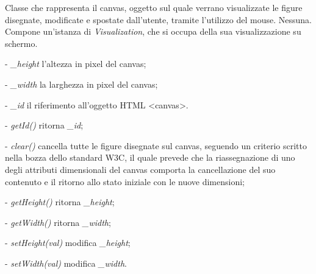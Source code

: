 Classe che rappresenta il canvas, oggetto sul quale verrano visualizzate le figure disegnate, modificate e spostate dall'utente, tramite l'utilizzo del mouse. 
Nessuna.
Compone un'istanza di \textit{Visualization}, che si occupa della sua visualizzazione su schermo.
\begin{elencopuntato}[\subsubsecindent]
\item[-] \textit{{\_}height} l'altezza in pixel del canvas;
\item[-] \textit{{\_}width} la larghezza in pixel del canvas;
\item[-] \textit{{\_}id} il riferimento all'oggetto HTML <canvas>.
\end{elencopuntato}
\begin{elencopuntato}[\subsubsecindent]
\item[-] \textit{getId()} ritorna  \textit{{\_}id};
\item[-] \textit{clear()} cancella tutte le figure disegnate sul canvas, seguendo un criterio scritto nella bozza dello standard W3C, il quale prevede che la riassegnazione di uno degli attributi dimensionali del canvas comporta la cancellazione del suo contenuto e il ritorno allo stato iniziale con le nuove dimensioni;
\item[-] \textit{getHeight()} ritorna  \textit{{\_}height};
\item[-] \textit{getWidth()} ritorna  \textit{{\_}width};
\item[-] \textit{setHeight(val)} modifica \textit{{\_}height};
\item[-] \textit{setWidth(val)} modifica \textit{{\_}width}.
\end{elencopuntato}

